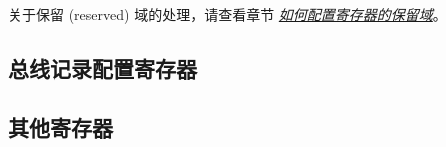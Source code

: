 \documentclass[main\_\_CN.tex]{subfiles}
\begin{document}
关于保留 (reserved) 域的处理，请查看章节 \hyperref[programming-reserved-field]{\textit{如何配置寄存器的保留域}}。

\subsection{总线记录配置寄存器}
\label{sec:dbgassist-mem-monitor-reg}



\subsection{其他寄存器}
\label{sec:dbgassist-bus-monitor-reg}



\end{document}
